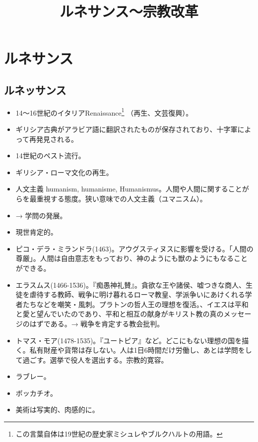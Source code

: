 \documentclass[uplatex,dvipdfmx]{jsarticle} \usepackage{mystyle}%
\title{ルネサンス〜宗教改革}
\begin{document}
\maketitle
\else\chapter{ルネサンス}
\fi


\section{ルネッサンス}

\begin{itemize}
\item 14〜16世紀のイタリアRenaissance\footnote{この言葉自体は19世紀の歴史家ミシュレやブルクハルトの用語。} （再生、文芸復興）。
\item ギリシア古典がアラビア語に翻訳されたものが保存されており、十字軍によって再発見される。
\item 14世紀のペスト流行。
\item ギリシア・ローマ文化の再生。
\item 人文主義 humanism, humanisme, Humanismus。人間や人間に関することがらを最重視する態度。狭い意味での人文主義（ユマニスム）。
\item → 学問の発展。
\item 現世肯定的。
\item ピコ・デラ・ミランドラ(1463)。アウグスティヌスに影響を受ける。「人間の尊厳」。人間は自由意志をもっており、神のようにも獣のようにもなることができる。
\item エラスムス(1466-1536)。『痴愚神礼賛』。貪欲な王や諸侯、嘘つきな商人、生徒を虐待する教師、戦争に明け暮れるローマ教皇、学派争いにあけくれる学者たちなどを嘲笑・風刺。プラトンの哲人王の理想を復活。、イエスは平和と愛と望んでいたのであり、平和と相互の献身がキリスト教の真のメッセージのはずである。→ 戦争を肯定する教会批判。
\item トマス・モア(1478-1535)。『ユートピア』など。どこにもない理想の国を描く。私有財産や貨幣は存しない。人は1日6時間だけ労働し、あとは学問をして過ごす。選挙で役人を選出する。宗教的寛容。
\item ラブレー。
\item ボッカチオ。
\item 美術は写実的、肉感的に。
\end{itemize}
\end{document}
